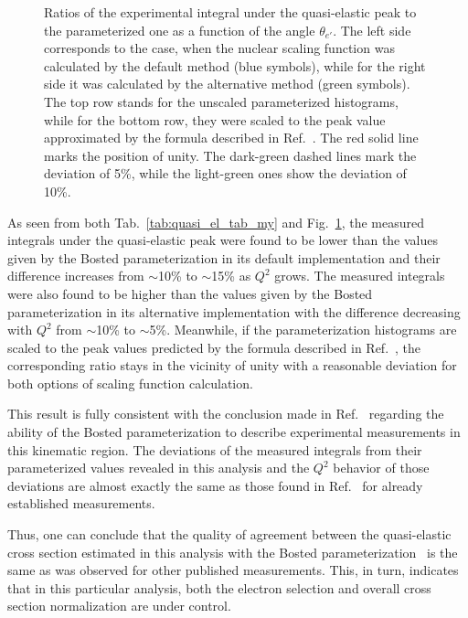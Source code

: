 \begin{figure}[htp]
\begin{center}
\begin{framed}
\end{framed}
\caption{\small Ratios of the experimental integral under the quasi-elastic peak to the parameterized one as a function of the angle $\theta_{e'}$. The left side corresponds to the case, when the nuclear scaling function was calculated by the default method (blue symbols), while for the right side it was calculated by the alternative method (green symbols). The top row stands for the unscaled parameterized histograms, while for the bottom row, they were scaled to the peak value approximated by the formula described in Ref.~\cite{note_QE_peak}. The red solid line marks the position of unity. The dark-green dashed lines mark the deviation of 5\%, while the light-green ones show the deviation of 10\%.} \label{fig:my_ratio}
\end{center}
\end{figure}

As seen from both Tab.~\ref{tab:quasi_el_tab_my} and Fig.~\ref{fig:my_ratio}, the measured integrals under the quasi-elastic peak were found to be lower than the values given by the Bosted parameterization in its default implementation and their difference increases from $\sim$10\% to $\sim$15\% as $Q^{2}$ grows. The measured integrals were also found to be higher than the values given by the Bosted parameterization in its alternative implementation with the difference decreasing with $Q^{2}$ from $\sim$10\% to $\sim$5\%. Meanwhile, if the parameterization histograms are scaled to the peak values predicted by the formula described in Ref.~\cite{note_QE_peak}, the corresponding ratio stays in the vicinity of unity with a reasonable deviation for both options of scaling function calculation. 

This result is fully consistent with the conclusion made in Ref.~\cite{note_QE_peak} regarding the ability of the Bosted parameterization to describe experimental measurements in this kinematic region. The deviations of the measured integrals from their parameterized values revealed in this analysis and the $Q^{2}$ behavior of those deviations are almost exactly the same as those found in Ref.~\cite{note_QE_peak} for already established measurements.

 

Thus, one can conclude that the quality of agreement between the quasi-elastic cross section estimated in this analysis  with the Bosted parameterization~\cite{Bosted_fit,Bosted:2007xd} is the same as was observed for other published measurements. This, in turn, indicates that in this particular analysis, both the electron selection and overall cross section normalization are under control.



